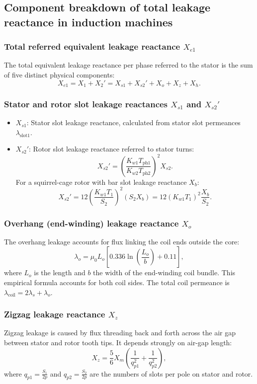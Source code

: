 \subsection{Component breakdown of total leakage reactance in induction machines}

\subsubsection{Total referred equivalent leakage reactance $X_{e1}$}
The total equivalent leakage reactance per phase referred to the stator is the sum of five distinct physical components:
\[
X_{e1} = X_1 + X_2' = X_{s1} + X_{s2}' + X_o + X_z + X_h.
\]

\subsubsection{Stator and rotor slot leakage reactances $X_{s1}$ and $X_{s2}'$}
\begin{itemize}
  \item \(X_{s1}\): Stator slot leakage reactance, calculated from stator slot permeances \(\lambda_{\mathrm{slot1}}\).
  \item \(X_{s2}'\): Rotor slot leakage reactance referred to stator turns:
  \[
  X_{s2}' = \left(\frac{K_{w1} T_{\mathrm{ph1}}}{K_{w2} T_{\mathrm{ph2}}}\right)^2 X_{s2}.
  \]
  For a squirrel-cage rotor with bar slot leakage reactance \(X_b\):
  \[
  X_{s2}' = 12\left(\frac{K_{w1} T_1}{S_2}\right)^2 (S_2 X_b) = 12 (K_{w1} T_1)^2 \frac{X_b}{S_2}.
  \]
\end{itemize}

\subsubsection{Overhang (end-winding) leakage reactance $X_o$}
The overhang leakage accounts for flux linking the coil ends outside the core:
\[
\lambda_o = \mu_0 L_o\left[ 0.336 \ln\!\left(\frac{L_o}{b}\right) + 0.11 \right],
\]
where \(L_o\) is the length and \(b\) the width of the end-winding coil bundle.
This empirical formula accounts for both coil sides. The total coil permeance is \(\lambda_{\mathrm{coil}} = 2\lambda_s + \lambda_o\).

\subsubsection{Zigzag leakage reactance $X_z$}
Zigzag leakage is caused by flux threading back and forth across the air gap between stator and rotor tooth tips. It depends strongly on air-gap length:
\[
X_z = \frac{5}{6} X_m\left(\frac{1}{q_{p1}^2} + \frac{1}{q_{p2}^2}\right),
\]
where \(q_{p1} = \frac{S_1}{2p}\) and \(q_{p2} = \frac{S_2}{2p}\) are the numbers of slots per pole on stator and rotor.

